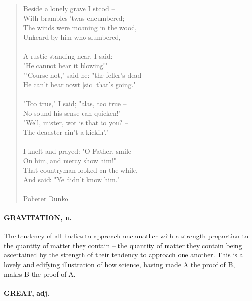 \documentclass[11pt]{article}
\begin{document}
\begin{quote}   Beside a lonely grave I stood -- \\
      With brambles 'twas encumbered; \\
  The winds were moaning in the wood, \\
      Unheard by him who slumbered, \\
 \\
  A rustic standing near, I said: \\
      "He cannot hear it blowing!" \\
  "'Course not," said he:  "the feller's dead -- \\
      He can't hear nowt [sic] that's going." \\
 \\
  "Too true," I said; "alas, too true -- \\
      No sound his sense can quicken!" \\
  "Well, mister, wot is that to you? -- \\
      The deadster ain't a-kickin'." \\
 \\
  I knelt and prayed:  "O Father, smile \\
      On him, and mercy show him!" \\
  That countryman looked on the while, \\
      And said:  "Ye didn't know him." \\
 \\
Pobeter Dunko \end{quote}


\paragraph{GRAVITATION, n.}  The tendency of all bodies to approach one another
with a strength proportion to the quantity of matter they contain --
the quantity of matter they contain being ascertained by the strength
of their tendency to approach one another.  This is a lovely and
edifying illustration of how science, having made A the proof of B,
makes B the proof of A.

\paragraph{GREAT, adj.}
\end{document}
